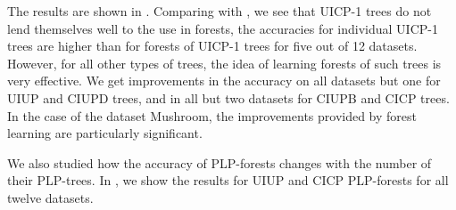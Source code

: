 The results are shown in . Comparing with ,
we see that UICP-1 trees do not lend themselves well to the use in forests,
the accuracies for individual UICP-1 trees are higher than for forests of
UICP-1 trees for five out of 12 datasets. However, for all other types of
trees, the idea of learning forests of such trees is very effective. We get
improvements in the accuracy on all datasets but one for UIUP and CIUPD
trees, and in all but two datasets for CIUPB and CICP trees. In the case 
of the dataset Mushroom, the improvements provided by forest learning are 
particularly significant.

We also studied how the accuracy of PLP-forests changes with the number of
their PLP-trees. In , we show the results for UIUP and CICP 
PLP-forests for all twelve datasets.

%
%

